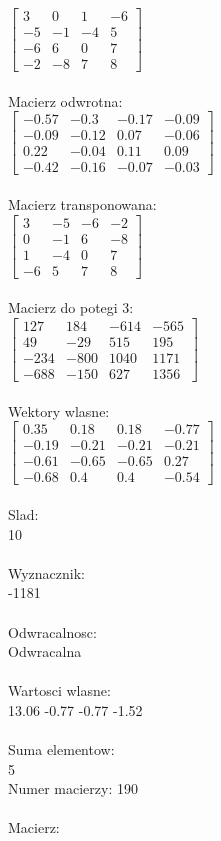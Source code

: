 \documentclass[a4paper,12pt]{article}
\begin{document}
$\begin{bmatrix} 3&0&1&-6\\-5&-1&-4&5\\-6&6&0&7\\-2&-8&7&8 \end{bmatrix}$
\\
\\
Macierz odwrotna:\\

$\begin{bmatrix} -0.57&-0.3&-0.17&-0.09\\-0.09&-0.12&0.07&-0.06\\0.22&-0.04&0.11&0.09\\-0.42&-0.16&-0.07&-0.03 \end{bmatrix}$
\\
\\
Macierz transponowana:\\

$\begin{bmatrix} 3&-5&-6&-2\\0&-1&6&-8\\1&-4&0&7\\-6&5&7&8 \end{bmatrix}$
\\
\\
Macierz do potegi 3:\\

$\begin{bmatrix} 127&184&-614&-565\\49&-29&515&195\\-234&-800&1040&1171\\-688&-150&627&1356 \end{bmatrix}$
\\
\\
Wektory wlasne:\\

$\begin{bmatrix} 0.35&0.18&0.18&-0.77\\-0.19&-0.21&-0.21&-0.21\\-0.61&-0.65&-0.65&0.27\\-0.68&0.4&0.4&-0.54 \end{bmatrix}$
\\
\\
Slad:\\
10
\\
\\
Wyznacznik:\\
-1181
\\
\\
Odwracalnosc:\\
Odwracalna
\\
\\
Wartosci wlasne:\\
13.06 -0.77 -0.77 -1.52
\\
\\
Suma elementow:\\
5
\\
\newpage
Numer macierzy:
190
\\
\\
Macierz:\\
\end{document}
